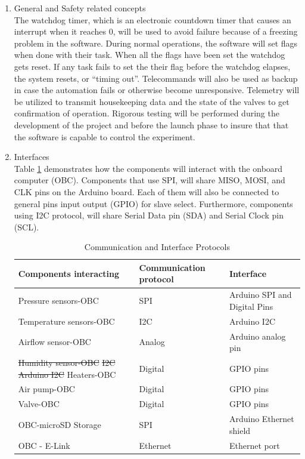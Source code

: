 \documentclass[a4paper,12pt,twoside]{article}
\providecommand{\DIFaddtex}[1]{{\protect\color{blue}\uwave{#1}}} %
\providecommand{\DIFdeltex}[1]{{\protect\color{red}\sout{#1}}}                      %
\providecommand{\DIFaddFL}[1]{\DIFadd{#1}} %
\providecommand{\DIFdelFL}[1]{\DIFdel{#1}} %
\providecommand{\DIFaddbeginFL}{} %
\providecommand{\DIFaddendFL}{} %
\providecommand{\DIFdelbeginFL}{} %
\providecommand{\DIFdelendFL}{} %
\providecommand{\DIFadd}[1]{\texorpdfstring{\DIFaddtex{#1}}{#1}} %
\providecommand{\DIFdel}[1]{\texorpdfstring{\DIFdeltex{#1}}{}} %
\newcommand{\DIFscaledelfig}{0.5}
\newlength{\DIFdelgraphicswidth} %
\newlength{\DIFdelgraphicsheight} %
\newcommand{\DIFaddincludegraphics}[2][]{{\color{blue}\fbox{\DIFOincludegraphics[#1]{#2}}}} %
\newcommand{\DIFdelincludegraphics}[2][]{%
\sbox{\DIFdelgraphicsbox}{\DIFOincludegraphics[#1]{#2}}%
\settoboxwidth{\DIFdelgraphicswidth}{\DIFdelgraphicsbox} %
\settoboxtotalheight{\DIFdelgraphicsheight}{\DIFdelgraphicsbox} %
\scalebox{\DIFscaledelfig}{%
\parbox[b]{\DIFdelgraphicswidth}{\usebox{\DIFdelgraphicsbox}\\[-\baselineskip] \rule{\DIFdelgraphicswidth}{0em}}\llap{\resizebox{\DIFdelgraphicswidth}{\DIFdelgraphicsheight}{%
\setlength{\unitlength}{\DIFdelgraphicswidth}%
\begin{picture}(1,1)%
\thicklines\linethickness{2pt} %
{\color[rgb]{1,0,0}\put(0,0){\framebox(1,1){}}}%
{\color[rgb]{1,0,0}\put(0,0){\line( 1,1){1}}}%
{\color[rgb]{1,0,0}\put(0,1){\line(1,-1){1}}}%
\end{picture}%
}\hspace*{3pt}}} %
} %
\DeclareRobustCommand{\DIFaddbeginFL}{\DIFOaddbeginFL \let\includegraphics\DIFaddincludegraphics} %
\DeclareRobustCommand{\DIFaddendFL}{\DIFOaddendFL \let\includegraphics\DIFOincludegraphics} %
\DeclareRobustCommand{\DIFdelbeginFL}{\DIFOdelbeginFL \let\includegraphics\DIFdelincludegraphics} %
\DeclareRobustCommand{\DIFdelendFL}{\DIFOaddendFL \let\includegraphics\DIFOincludegraphics} %
\begin{document}
\begin{enumerate}[label=(\alph*)]
\item{General and Safety related concepts}\\
The watchdog timer, which is an electronic countdown timer that causes an interrupt when it reaches 0, will be used to avoid failure because of a freezing problem in the software. During normal operations, the software will set flags when done with their task. When all the flags have been set the watchdog gets reset. If any task fails to set the their flag before the watchdog elapses, the system resets, or \enquote{timing out}. Telecommands will also be used as backup in case the automation fails or otherwise become unresponsive. Telemetry will be utilized to transmit housekeeping data and the state of the valves to get confirmation of operation. Rigorous testing will be performed during the development of the project and before the launch phase to insure that that the software is capable to control the experiment.
\item{Interfaces}\\
Table \ref{tab:comIntpro} demonstrates how the components will interact with the onboard computer (OBC). Components that use SPI, will share MISO, MOSI, and CLK pins on the Arduino board. Each of them will also be connected to general pins input output (GPIO) for slave select. Furthermore, components using I2C protocol, will share Serial Data pin (SDA) and Serial Clock pin (SCL).

\begin{table}[H]
\centering
\begin{tabular}{lll}
\textbf{Components interacting} & \textbf{Communication protocol} & \textbf{Interface}                 \\ \hline
Pressure sensors-OBC   & SPI                    & Arduino SPI and Digital Pins \\
Temperature sensors-OBC        & I2C                    & Arduino I2C \\
Airflow sensor-OBC     & Analog                    & Arduino analog pin \\
\DIFdelbeginFL \DIFdelFL{Humidity sensor-OBC            }%
\DIFdelFL{I2C                }%
\DIFdelFL{Arduino I2C }%
\DIFdelendFL Heaters-OBC            & Digital                & GPIO pins \\
Air pump-OBC           & Digital                & GPIO pins \\
Valve-OBC              & Digital                & GPIO pins                 \\
OBC-microSD Storage    & SPI                    & Arduino Ethernet shield   \\
OBC - E-Link           & Ethernet               & Ethernet port            
\end{tabular}%
\caption{Communication and Interface Protocols\DIFaddbeginFL \DIFaddFL{.}\DIFaddendFL }
\label{tab:comIntpro}
\end{table}


\end{enumerate}
\end{document}
